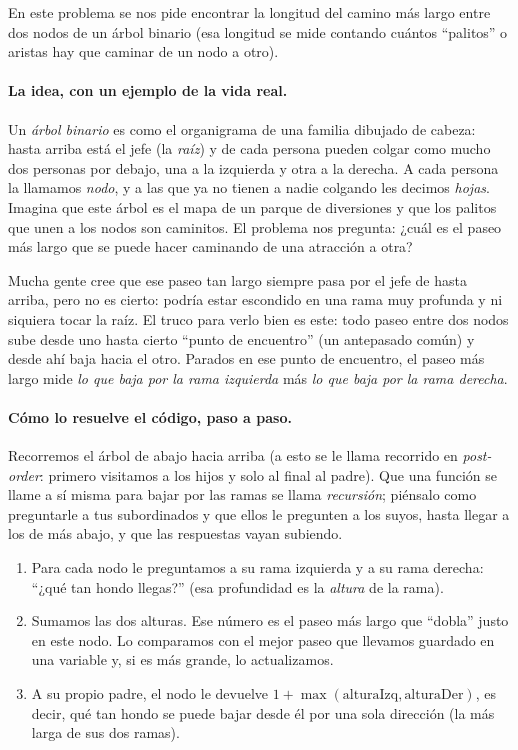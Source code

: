 
En este problema se nos pide encontrar la longitud del camino más largo entre dos nodos de un árbol binario (esa longitud se mide contando cuántos ``palitos'' o aristas hay que caminar de un nodo a otro).

\paragraph{La idea, con un ejemplo de la vida real.} Un \emph{árbol binario} es como el organigrama de una familia dibujado de cabeza: hasta arriba está el jefe (la \emph{raíz}) y de cada persona pueden colgar como mucho dos personas por debajo, una a la izquierda y otra a la derecha. A cada persona la llamamos \emph{nodo}, y a las que ya no tienen a nadie colgando les decimos \emph{hojas}. Imagina que este árbol es el mapa de un parque de diversiones y que los palitos que unen a los nodos son caminitos. El problema nos pregunta: ¿cuál es el paseo más largo que se puede hacer caminando de una atracción a otra?

Mucha gente cree que ese paseo tan largo siempre pasa por el jefe de hasta arriba, pero no es cierto: podría estar escondido en una rama muy profunda y ni siquiera tocar la raíz. El truco para verlo bien es este: todo paseo entre dos nodos sube desde uno hasta cierto ``punto de encuentro'' (un antepasado común) y desde ahí baja hacia el otro. Parados en ese punto de encuentro, el paseo más largo mide \emph{lo que baja por la rama izquierda} más \emph{lo que baja por la rama derecha}.

\paragraph{Cómo lo resuelve el código, paso a paso.} Recorremos el árbol de abajo hacia arriba (a esto se le llama recorrido en \emph{post-order}: primero visitamos a los hijos y solo al final al padre). Que una función se llame a sí misma para bajar por las ramas se llama \emph{recursión}; piénsalo como preguntarle a tus subordinados y que ellos le pregunten a los suyos, hasta llegar a los de más abajo, y que las respuestas vayan subiendo.

\begin{enumerate}
  \item Para cada nodo le preguntamos a su rama izquierda y a su rama derecha: ``¿qué tan hondo llegas?'' (esa profundidad es la \emph{altura} de la rama).
  \item Sumamos las dos alturas. Ese número es el paseo más largo que ``dobla'' justo en este nodo. Lo comparamos con el mejor paseo que llevamos guardado en una variable y, si es más grande, lo actualizamos.
  \item A su propio padre, el nodo le devuelve $1 + \max(\text{alturaIzq}, \text{alturaDer})$, es decir, qué tan hondo se puede bajar desde él por una sola dirección (la más larga de sus dos ramas).
\end{enumerate}

